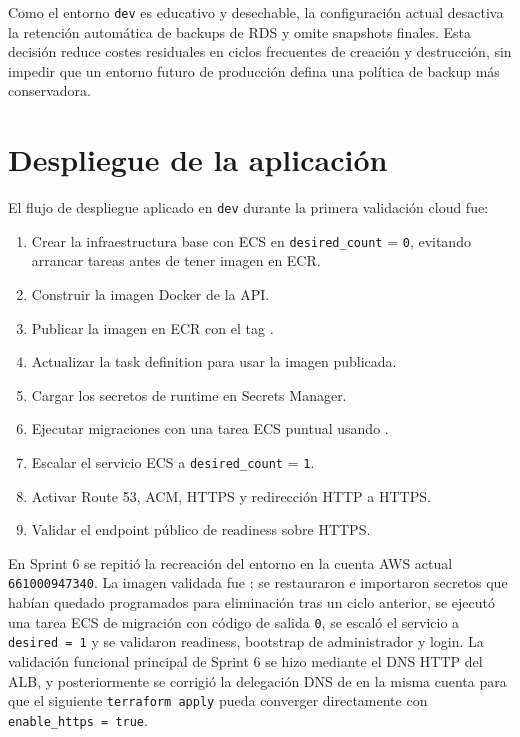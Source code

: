 Como el entorno \texttt{dev} es educativo y desechable, la configuración actual desactiva la retención automática de backups de RDS y omite snapshots finales. Esta decisión reduce costes residuales en ciclos frecuentes de creación y destrucción, sin impedir que un entorno futuro de producción defina una política de backup más conservadora.

\section{Despliegue de la aplicación}
\label{sec:despliegue-aplicacion}

El flujo de despliegue aplicado en \texttt{dev} durante la primera validación cloud fue:

\begin{enumerate}
  \item Crear la infraestructura base con ECS en \texttt{desired\_count} = \texttt{0}, evitando arrancar tareas antes de tener imagen en ECR.
  \item Construir la imagen Docker de la API.
  \item Publicar la imagen en ECR con el tag .
  \item Actualizar la task definition para usar la imagen publicada.
  \item Cargar los secretos de runtime en Secrets Manager.
  \item Ejecutar migraciones con una tarea ECS puntual usando .
  \item Escalar el servicio ECS a \texttt{desired\_count} = \texttt{1}.
  \item Activar Route 53, ACM, HTTPS y redirección HTTP a HTTPS.
  \item Validar el endpoint público de readiness sobre HTTPS.
\end{enumerate}

En Sprint 6 se repitió la recreación del entorno en la cuenta AWS actual \texttt{661000947340}. La imagen validada fue ; se restauraron e importaron secretos que habían quedado programados para eliminación tras un ciclo anterior, se ejecutó una tarea ECS de migración con código de salida \texttt{0}, se escaló el servicio a \texttt{desired = 1} y se validaron readiness, bootstrap de administrador y login. La validación funcional principal de Sprint 6 se hizo mediante el DNS HTTP del ALB, y posteriormente se corrigió la delegación DNS de  en la misma cuenta para que el siguiente \texttt{terraform apply} pueda converger directamente con \texttt{enable\_https = true}.

